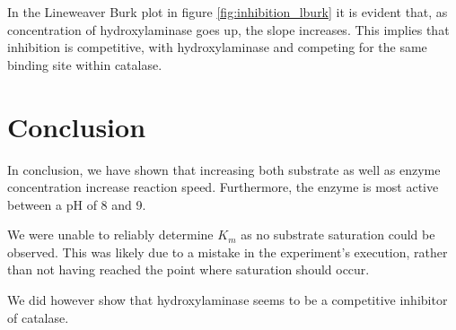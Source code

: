 \documentclass[a4paper,english]{scrreprt}
\begin{document}
In the Lineweaver Burk plot in figure \ref{fig:inhibition_lburk} it is evident
that, as concentration of hydroxylaminase goes up, the slope increases. This
implies that inhibition is competitive\cite{wiki:lburk}, with hydroxylaminase and 
competing for the same binding site within catalase.

\chapter{Conclusion}

In conclusion, we have shown that increasing both substrate as well as enzyme
concentration increase reaction speed. Furthermore, the enzyme is most active
between a pH of 8 and 9.

We were unable to reliably determine $K_m$ as no substrate saturation could be
observed. This was likely due to a mistake in the experiment's execution,
rather than not having reached the point where saturation should occur.

We did however show that hydroxylaminase seems to be a competitive inhibitor of
catalase.



\end{document}
